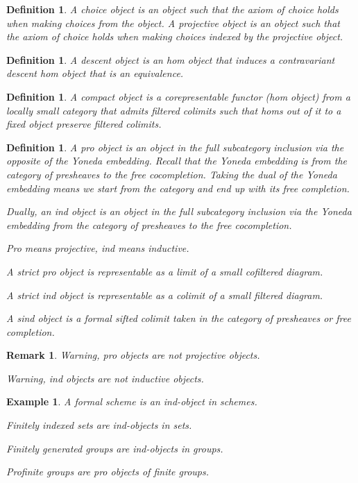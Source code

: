 \documentclass{tufte-book}
\newtheorem{definition}[theorem]{Definition}
\newtheorem{example}[theorem]{Example}
\newtheorem{remark}[theorem]{Remark}
\begin{document}
 \begin{definition}
     A choice object is an object such that the axiom of choice holds when making choices from the object. A projective object is an object such that the axiom of choice holds when making choices indexed by the projective object.
 \end{definition}
 
 \begin{definition}
     A descent object is an hom object that induces a contravariant descent hom object that is an equivalence.
 \end{definition}
 
 \begin{definition}
     A compact object is a corepresentable functor (hom object) from a locally small category that admits filtered colimits such that homs out of it to a fixed object preserve filtered colimits.
 \end{definition}
 
 \begin{definition}
     A pro object is an object in the full subcategory inclusion via the opposite of the Yoneda embedding. Recall that the Yoneda embedding is from the category of presheaves to the free cocompletion. Taking the dual of the Yoneda embedding means we start from the category and end up with its free completion.
 
     Dually, an ind object is an object in the full subcategory inclusion via the Yoneda embedding from the category of presheaves to the free cocompletion.
 
     Pro means projective, ind means inductive.
 
     A strict pro object is representable as a limit of a small cofiltered diagram.
 
     A strict ind object is representable as a colimit of a small filtered diagram.
 
     A sind object is a formal sifted colimit taken in the category of presheaves or free completion.
 \end{definition}
 
 \begin{remark}
     Warning, pro objects are not projective objects.
 
     Warning, ind objects are not inductive objects.
 \end{remark}
 
 \begin{example}
     A formal scheme is an ind-object in schemes.
 
     Finitely indexed sets are ind-objects in sets.
 
     Finitely generated groups are ind-objects in groups.
 
     Profinite groups are pro objects of finite groups.
 \end{example}
 
\end{document}
